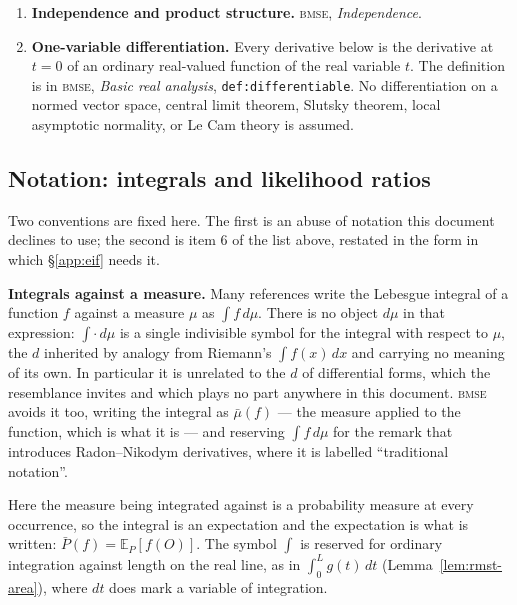 \documentclass[11pt,a4paper]{article}
\theoremstyle{plain}
\theoremstyle{definition}
\theoremstyle{remark}
\newcommand{\E}{\mathbb E}
\newcommand{\code}[1]{\texttt{\small #1}}
\newcommand{\probrepo}{\textsc{bmse}}
\begin{document}
\begin{enumerate}[leftmargin=*]
\begin{center}
\end{center}
They are used throughout \S\ref{app:eif} and restated in \S\ref{app:notation}.
\item \textbf{Independence and product structure.} \probrepo{}, \emph{Independence}.
\item \textbf{One-variable differentiation.} Every derivative below is the derivative at
$t=0$ of an ordinary real-valued function of the real variable $t$. The definition is in
\probrepo{}, \emph{Basic real analysis}, \code{def:differentiable}. No differentiation on a
normed vector space, central limit theorem, Slutsky theorem, local asymptotic normality, or
Le Cam theory is assumed.
\end{enumerate}

\subsection{Notation: integrals and likelihood ratios}\label{app:notation}

Two conventions are fixed here. The first is an abuse of notation this document declines to use;
the second is item 6 of the list above, restated in the form in which \S\ref{app:eif} needs it.

\textbf{Integrals against a measure.} Many references write the Lebesgue integral of a function
$f$ against a measure $\mu$ as $\int f\,d\mu$. There is no object $d\mu$ in that expression:
$\int\cdot\,d\mu$ is a single indivisible symbol for the integral with respect to $\mu$, the $d$
inherited by analogy from Riemann's $\int f(x)\,dx$ and carrying no meaning of its own. In
particular it is unrelated to the $d$ of differential forms, which the resemblance invites and
which plays no part anywhere in this document. \probrepo{} avoids it too, writing the integral as
$\bar\mu(f)$ --- the measure applied to the function, which is what it is --- and reserving
$\int f\,d\mu$ for the remark that introduces Radon--Nikodym derivatives, where it is labelled
``traditional notation''.

Here the measure being integrated against is a probability measure at every occurrence, so the
integral is an expectation and the expectation is what is written: $\bar P(f)=\E_P[f(O)]$. The
symbol $\int$ is reserved for ordinary integration against length on the real line, as in
$\int_0^Lg(t)\,dt$ (Lemma~\ref{lem:rmst-area}), where $dt$ does mark a variable of integration.
\end{document}
